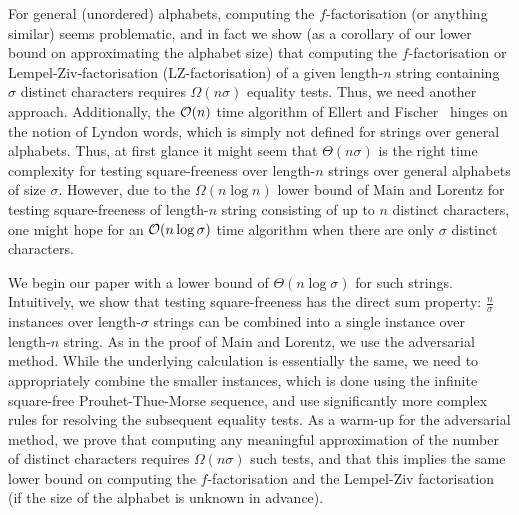 For general (unordered)
alphabets, computing the $f$-factorisation (or anything similar) seems problematic, and in fact we show (as a corollary of our lower
bound on approximating the alphabet size) that computing the $f$-factorisation or Lempel-Ziv-factorisation (LZ-factorisation) of a given length-$n$
string containing $\sigma$ distinct characters requires $\Omega(n\sigma)$ equality tests. Thus, we need another approach.
Additionally, the $\mathcal{O}(n)$ time algorithm of Ellert and Fischer~\cite{Ellert2021} hinges on the notion of Lyndon words, which is simply
not defined for strings over general alphabets. Thus, at first glance it might seem that $\Theta(n\sigma)$ is the right time complexity
for testing square-freeness over length-$n$ strings over general alphabets of size $\sigma$. However, due to the $\Omega(n\log n)$
lower bound of Main and Lorentz for testing square-freeness of length-$n$ string consisting of up to $n$ distinct characters,
one might hope for an $\mathcal{O}(n\log \sigma)$ time algorithm when there are only $\sigma$ distinct characters.

We begin our paper with a lower bound of $\Theta(n\log \sigma)$ for such strings. Intuitively, we show that testing square-freeness
has the direct sum property: $\frac{n}{\sigma}$ instances over length-$\sigma$ strings can be combined into a single instance over length-$n$ string.
As in the proof of Main and Lorentz, we use the adversarial method. While the underlying calculation is essentially the same,
we need to appropriately combine the smaller instances, which is done using the infinite square-free Prouhet-Thue-Morse sequence, and use significantly
more complex rules for resolving the subsequent equality tests. As a warm-up for the adversarial method, we prove that computing
any meaningful approximation of the number of distinct characters requires $\Omega(n\sigma)$ such tests, and that this implies
the same lower bound on computing the $f$-factorisation and the Lempel-Ziv factorisation (if the size of the alphabet is unknown in advance).

